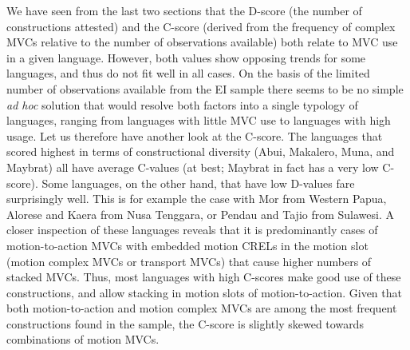 We have seen from the last two sections that the D-score (the number of constructions attested) and the C-score (derived from the frequency of complex MVCs relative to the number of observations available) both relate to MVC use in a given language. However, both values show opposing trends for some languages, and thus do not fit well in all cases. On the basis of the limited number of observations available from the EI sample there seems to be no simple \textit{ad hoc} solution that would resolve both factors into a single typology of languages, ranging from languages with little MVC use to languages with high usage. Let us therefore have another look at the C-score. The languages that scored highest in terms of constructional diversity (Abui, Makalero, Muna, and Maybrat) all have average C-values (at best; Maybrat in fact has a very low C-score). Some  languages, on the other hand, that have low D-values fare surprisingly well. This is for example the case with Mor from Western Papua, Alorese and Kaera from Nusa Tenggara, or Pendau and Tajio from Sulawesi. A closer inspection of these languages reveals that it is predominantly cases of motion-to-action MVCs with embedded motion CRELs in the motion slot (motion complex MVCs or transport MVCs) that cause higher numbers of stacked MVCs. Thus, most languages with high C-scores make good use of these constructions, and allow stacking in motion slots of motion-to-action. Given that both motion-to-action and motion complex MVCs are among the most frequent constructions found in the sample, the C-score is slightly skewed towards combinations of motion MVCs.

